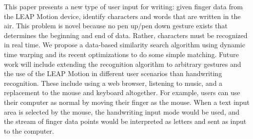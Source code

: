 This paper presents a new type of user input for writing: given finger data from the LEAP Motion device, identify characters and words that are written in the air. This problem is novel because no pen up/pen down gesture exists that determines the beginning and end of data. Rather, characters must be recognized in real time. We propose a data-based similarity search algorithm using dynamic time warping and its recent optimizations to do some simple matching. Future work will include extending the recognition algorithm to arbitrary gestures and the use of the LEAP Motion in different user scenarios than handwriting recognition. These include using a web browser, listening to music, and a replacement to the mouse and keyboard altogether. For example, users can use their computer as normal by moving their finger as the mouse. When a text input area is selected by the mouse, the handwriting input mode would be used, and the stream of finger data points would be interpreted as letters and sent as input to the computer. \\
